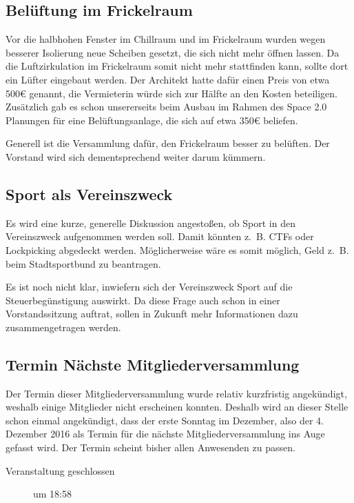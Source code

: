 \documentclass[a4paper,12pt]{scrartcl}
\begin{document}
\subsection{Belüftung im Frickelraum}
Vor die halbhohen Fenster im Chillraum und im Frickelraum wurden wegen besserer
Isolierung neue Scheiben gesetzt, die sich nicht mehr öffnen lassen. Da die
Luftzirkulation im Frickelraum somit nicht mehr stattfinden kann, sollte dort
ein Lüfter eingebaut werden. Der Architekt hatte dafür einen Preis von etwa 500€
genannt, die Vermieterin würde sich zur Hälfte an den Kosten beteiligen.
Zusätzlich gab es schon unsererseits beim Ausbau im Rahmen des Space 2.0
Planungen für eine Belüftungsanlage, die sich auf etwa 350€ beliefen.

Generell ist die Versammlung dafür, den Frickelraum besser zu belüften. Der
Vorstand wird sich dementsprechend weiter darum kümmern.

\subsection{Sport als Vereinszweck}
Es wird eine kurze, generelle Diskussion angestoßen, ob Sport in den
Vereinszweck aufgenommen werden soll. Damit könnten z.~B. CTFs oder Lockpicking
abgedeckt werden. Möglicherweise wäre es somit möglich, Geld z.~B. beim
Stadtsportbund zu beantragen.

Es ist noch nicht klar, inwiefern sich der Vereinszweck Sport auf die
Steuerbegünstigung auswirkt. Da diese Frage auch schon in einer Vorstandssitzung
auftrat, sollen in Zukunft mehr Informationen dazu zusammengetragen werden.

\subsection{Termin Nächste Mitgliederversammlung}
Der Termin dieser Mitgliederversammlung wurde relativ kurzfristig angekündigt,
weshalb einige Mitglieder nicht erscheinen konnten. Deshalb wird an dieser
Stelle schon einmal angekündigt, dass der erste Sonntag im Dezember, also der 4.
Dezember 2016 als Termin für die nächste Mitgliederversammlung ins Auge gefasst
wird. Der Termin scheint bisher allen Anwesenden zu passen.

\begin{description}
  \item[Veranstaltung geschlossen] um 18:58
\end{description}
\end{document}
